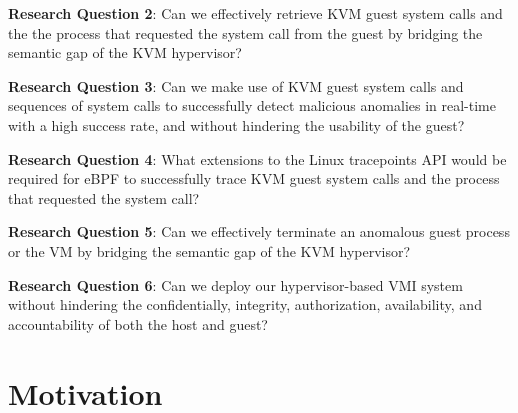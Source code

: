 \documentclass{report}
\begin{document}
\begin{spacing}{1.5}
{\large
\noindent \textbf{Research Question 2}: Can we effectively retrieve KVM guest system calls and the the process that requested the system call from the guest by bridging the semantic gap of the KVM hypervisor?
\newline
}


{\large
\noindent \textbf{Research Question 3}: Can we make use of KVM guest system calls and sequences of system calls to successfully detect malicious anomalies in real-time with a high success rate, and without hindering the usability of the guest?
\newline
}


{\large
\noindent \textbf{Research Question 4}: What extensions to the Linux tracepoints API would be required for eBPF to successfully trace KVM guest system calls and the process that requested the system call?
\newline
}

{\large
\noindent \textbf{Research Question 5}: Can we effectively terminate an anomalous guest process or the VM by bridging the semantic gap of the KVM hypervisor?
\newline
}

{\large
\noindent \textbf{Research Question 6}: Can we deploy our hypervisor-based VMI system without hindering the confidentially, integrity, authorization, availability, and accountability of both the host and guest?  
\newline
}


\section{Motivation}


\end{spacing}
\end{document}
